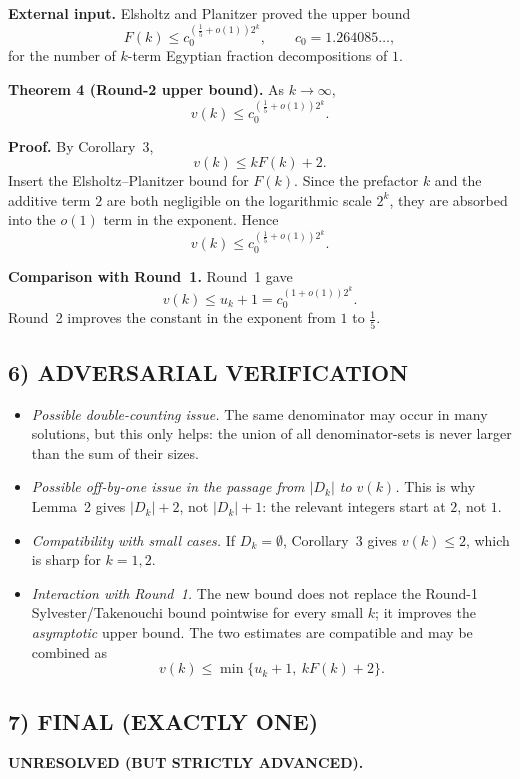 \medskip
\noindent\textbf{External input.}
Elsholtz and Planitzer proved the upper bound
\[
F(k)\le c_0^{(\frac15+o(1))2^k},
\qquad c_0=1.264085\ldots,
\]
for the number of $k$-term Egyptian fraction decompositions of $1$.

\medskip
\noindent\textbf{Theorem 4 (Round-2 upper bound).}
As $k\to\infty$,
\[
v(k)\le c_0^{(\frac15+o(1))2^k}.
\]

\medskip
\noindent\textbf{Proof.}
By Corollary~3,
\[
v(k)\le kF(k)+2.
\]
Insert the Elsholtz--Planitzer bound for $F(k)$. Since the prefactor $k$ and the additive term $2$ are both negligible on the logarithmic scale $2^k$, they are absorbed into the $o(1)$ term in the exponent. Hence
\[
v(k)\le c_0^{(\frac15+o(1))2^k}.
\]

\medskip
\noindent\textbf{Comparison with Round~1.}
Round~1 gave
\[
v(k)\le u_k+1=c_0^{(1+o(1))2^k}.
\]
Round~2 improves the constant in the exponent from $1$ to $\frac15$.

\subsection*{6) ADVERSARIAL VERIFICATION}

\begin{itemize}
\item \emph{Possible double-counting issue.} The same denominator may occur in many solutions, but this only helps: the union of all denominator-sets is never larger than the sum of their sizes.
\item \emph{Possible off-by-one issue in the passage from $|D_k|$ to $v(k)$.} This is why Lemma~2 gives $|D_k|+2$, not $|D_k|+1$: the relevant integers start at $2$, not $1$.
\item \emph{Compatibility with small cases.} If $D_k=\emptyset$, Corollary~3 gives $v(k)\le 2$, which is sharp for $k=1,2$.
\item \emph{Interaction with Round~1.} The new bound does not replace the Round-1 Sylvester/Takenouchi bound pointwise for every small $k$; it improves the \emph{asymptotic} upper bound. The two estimates are compatible and may be combined as
\[
v(k)\le \min\{u_k+1,\ kF(k)+2\}.
\]
\end{itemize}

\subsection*{7) FINAL (EXACTLY ONE)}

\textbf{UNRESOLVED (BUT STRICTLY ADVANCED).}

